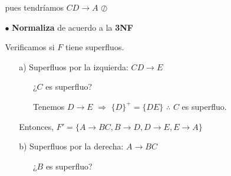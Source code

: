 \documentclass[12pt, letterpaper]{article}
\begin{document}
\begin{itemize}
\begin{itemize}
\begin{itemize}
                                        pues tendríamos $CD \rightarrow A$ $\oslash$ \vspace{.2cm}
                         
                        \item[$\bullet$] \textbf{Normaliza} de acuerdo a la 
                                        \textbf{3NF}\vspace{.3cm}

                                        Verificamos si $F$ tiene superfluos.

                                        \begin{itemize}
                                            \item[a)] Superfluos por la izquierda: $CD \rightarrow E$
                                            
                                                      \begin{enumerate}

                                                          \item[] ¿$C$ es superfluo?\vspace{.1cm}
                                                           
                                                                  Tenemos $D \rightarrow E$ $\Rightarrow$ $\{D\}^+=\{DE\}$ $\therefore$ $C$ es superfluo.\vspace{.2cm}

                                                      \end{enumerate}

                                                      Entonces, $F'=\{A\rightarrow BC, B\rightarrow D, D \rightarrow E, E\rightarrow A\}$ \vspace{.2cm}

                                            \item[b)] Superfluos por la derecha: $A \rightarrow BC$
                                            
                                                      \begin{enumerate}

                                                          \item[] ¿$B$ es superfluo? \vspace{.1cm}
                                                          

\end{enumerate}
\end{itemize}
\end{itemize}
\end{itemize}
\end{itemize}
\end{document}

